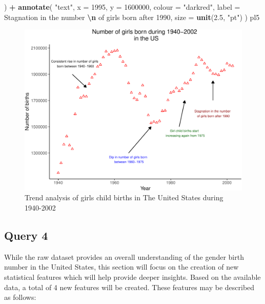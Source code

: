 \documentclass[11pt,a4paper,]{article}
\newenvironment{Shaded}{\begin{snugshade}}{\end{snugshade}}
\newcommand{\AttributeTok}[1]{\textcolor[rgb]{0.13,0.29,0.53}{#1}}
\newcommand{\DecValTok}[1]{\textcolor[rgb]{0.00,0.00,0.81}{#1}}
\newcommand{\FloatTok}[1]{\textcolor[rgb]{0.00,0.00,0.81}{#1}}
\newcommand{\FunctionTok}[1]{\textcolor[rgb]{0.13,0.29,0.53}{\textbf{#1}}}
\newcommand{\NormalTok}[1]{#1}
\newcommand{\SpecialCharTok}[1]{\textcolor[rgb]{0.81,0.36,0.00}{\textbf{#1}}}
\newcommand{\StringTok}[1]{\textcolor[rgb]{0.31,0.60,0.02}{#1}}
\begin{document}
\begin{Shaded}
\begin{Highlighting}[]
\NormalTok{  ) }\SpecialCharTok{+}
  \FunctionTok{annotate}\NormalTok{(}
    \StringTok{"text"}\NormalTok{,}
    \AttributeTok{x =} \DecValTok{1995}\NormalTok{,}
    \AttributeTok{y =} \DecValTok{1600000}\NormalTok{,}
    \AttributeTok{colour =} \StringTok{"darkred"}\NormalTok{,}
    \AttributeTok{label =} \StringTok{\textquotesingle{}Stagnation in the number }\SpecialCharTok{\textbackslash{}n}\StringTok{ of girls born after 1990\textquotesingle{}}\NormalTok{,}
    \AttributeTok{size =} \FunctionTok{unit}\NormalTok{(}\FloatTok{2.5}\NormalTok{, }\StringTok{"pt"}\NormalTok{)}
\NormalTok{  )  }
\NormalTok{pl5}
\end{Highlighting}
\end{Shaded}

\begin{figure}

\includegraphics{Arindom_Baruah_32779267_files/figure-latex/pres-1} \hfill{}

\caption{Trend analysis of girls child births in The United States during 1940-2002}\label{fig:pres}
\end{figure}
\normalsize
\newpage

\hypertarget{query-4}{%
\subsection{Query 4}\label{query-4}}

While the raw dataset provides an overall understanding of the gender birth number in the United States, this section will focus on the creation of new statistical features which will help provide deeper insights. Based on the available data, a total of 4 new features will be created. These features may be described as follows:
\end{document}
